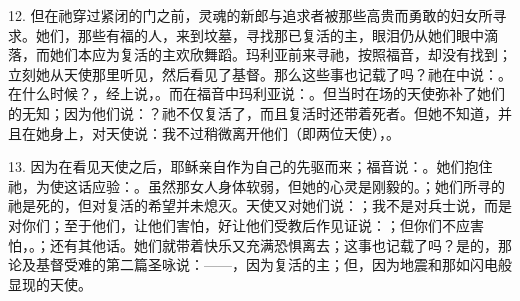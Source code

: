 12. 但在祂穿过紧闭的门之前，灵魂的新郎与追求者被那些高贵而勇敢的妇女所寻求。她们，那些有福的人，来到坟墓，寻找那已复活的主，眼泪仍从她们眼中滴落，而她们本应为复活的主欢欣舞蹈。玛利亚前来寻祂，按照福音，却没有找到；立刻她从天使那里听见，然后看见了基督。那么这些事也记载了吗？祂在中说：。在什么时候？，经上说，。而在福音中玛利亚说：。但当时在场的天使弥补了她们的无知；因为他们说：？祂不仅复活了，而且复活时还带着死者。但她不知道，并且在她身上，对天使说：我不过稍微离开他们（即两位天使），。\par

13. 因为在看见天使之后，耶稣亲自作为自己的先驱而来；福音说：。她们抱住祂，为使这话应验：。虽然那女人身体软弱，但她的心灵是刚毅的。；她们所寻的祂是死的，但对复活的希望并未熄灭。天使又对她们说：；我不是对兵士说，而是对你们；至于他们，让他们害怕，好让他们受教后作见证说：；但你们不应害怕，。；还有其他话。她们就带着快乐又充满恐惧离去；这事也记载了吗？是的，那论及基督受难的第二篇圣咏说：——，因为复活的主；但，因为地震和那如闪电般显现的天使。\par

